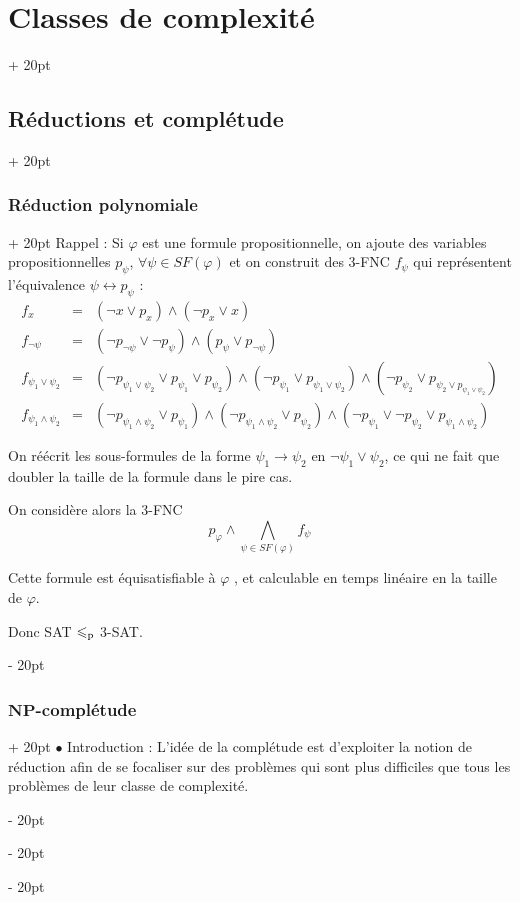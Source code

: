 \documentclass[a4paper, 12pt, twoside]{article}
\renewcommand{\le}{\leqslant}
\newcommand{\ind}[1][20pt]{\advance\leftskip + #1}
\newcommand{\deind}[1][20pt]{\advance\leftskip - #1}
\newenvironment{indt}[2][20pt]{#2 \par \ind[#1]}{\par \deind} %
\begin{document}
\begin{indt}{\section{Classes de complexité}}
\begin{indt}{\subsection{Réductions et complétude}}
\begin{indt}{\subsubsection{Réduction polynomiale}}
                Rappel : Si $\varphi$ est une formule propositionnelle, on ajoute des variables propositionnelles $p_\psi$, $\forall \psi \in SF(\varphi)$ et on construit des 3-FNC $f_\psi$ qui représentent l'équivalence $\psi \leftrightarrow p_\psi$ :
                \[
                    \begin{array}{rcl}
                        f_x &=& (\neg x \vee p_x) \wedge (\neg p_x \vee x)
                        \\
                        f_{\neg \psi} &=& (\neg p_{\neg \psi} \vee \neg p_\psi) \wedge (p_\psi \vee p_{\neg \psi})
                        \\
                        f_{\psi_1 \vee \psi_2} &=& (\neg p_{\psi_1 \vee \psi_2} \vee p_{\psi_1} \vee p_{\psi_2}) \wedge (\neg p_{\psi_1} \vee p_{\psi_1 \vee \psi_2}) \wedge (\neg p_{\psi_2} \vee p_{\psi_2 \vee p_{\psi_1 \vee \psi_2}})
                        \\
                        f_{\psi_1 \wedge \psi_2} &=& (\neg p_{\psi_1 \wedge \psi_2} \vee p_{\psi_1}) \wedge (\neg p_{\psi_1 \wedge \psi_2} \vee p_{\psi_2}) \wedge (\neg p_{\psi_1} \vee \neg p_{\psi_2} \vee p_{\psi_1 \wedge \psi_2})
                    \end{array}
                \]

                On réécrit les sous-formules de la forme $\psi_1 \rightarrow \psi_2$ en $\neg \psi_1 \vee \psi_2$, ce qui ne fait que doubler la taille de la formule dans le pire cas.

                On considère alors la 3-FNC
                \[
                    p_\varphi \wedge \bigwedge_{\psi \in SF(\varphi)} f_\psi
                \]

                Cette formule est équisatisfiable à $\varphi$ , et calculable en temps linéaire en la taille de $\varphi$.

                Donc SAT $\le_{\rm p}$ 3-SAT.
            \end{indt}

            \vspace{12pt}
            
            \begin{indt}{\subsubsection{$\mathbf{NP}$-complétude}}
                $\bullet$ Introduction : L'idée de la complétude est d'exploiter la notion de réduction afin de se focaliser sur des problèmes qui sont plus difficiles que tous les problèmes de leur classe de complexité.


\end{indt}
\end{indt}
\end{indt}
\end{document}
